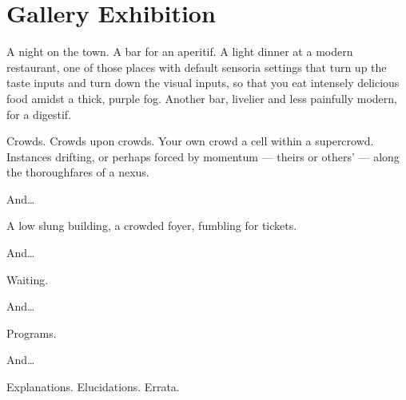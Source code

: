 \chapter{Gallery Exhibition}

A night on the town. A bar for an aperitif. A light dinner at a modern restaurant, one of those places with default sensoria settings that turn up the taste inputs and turn down the visual inputs, so that you eat intensely delicious food amidst a thick, purple fog. Another bar, livelier and less painfully modern, for a digestif.

Crowds. Crowds upon crowds. Your own crowd a cell within a supercrowd. Instances drifting, or perhaps forced by momentum --- theirs or others' --- along the thoroughfares of a nexus.

\vfill

\begin{center}
  And\ldots{}
\end{center}

\vfill

\newpage

\null
\vfill

A low slung building, a crowded foyer, fumbling for tickets.

\vfill

\begin{center}
  And\ldots{}
\end{center}

\vfill

\newpage

\null
\vfill

Waiting.

\vfill

\begin{center}
  And\ldots{}
\end{center}

\vfill

\newpage

\null
\vfill

Programs.

\vfill

\begin{center}
  And\ldots{}
\end{center}

\vfill

\newpage

\null
\vfill

Explanations. Elucidations. Errata.

\vfill

